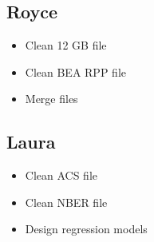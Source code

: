 \documentclass[12pt]{article}
\begin{document}
\subsection{Royce}
\begin{itemize}
    \item Clean 12 GB file
    \item Clean BEA RPP file
    \item Merge files
\end{itemize}

\subsection{Laura}
\begin{itemize}
    \item Clean ACS file
    \item Clean NBER file
    \item Design regression models
\end{itemize}
\end{document}
